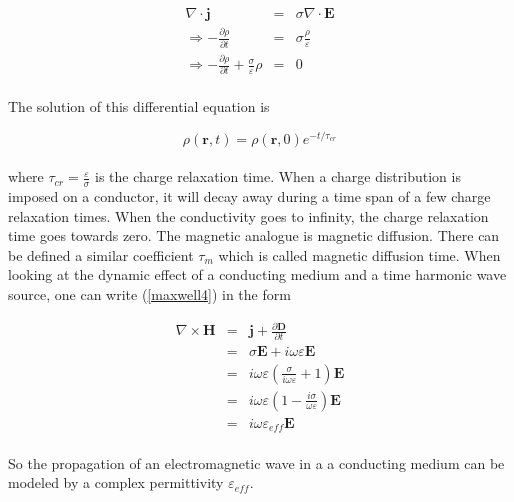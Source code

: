 \documentclass[a4paper,10pt]{thesis}
\begin{document}
\begin{eqnarray}
   \nabla \cdot \mathbf{j}&=&\sigma \nabla \cdot \mathbf{E}  \\
\Rightarrow -\frac{\partial \rho}{\partial t} &=& \sigma \frac{\rho}{\varepsilon}\\
\Rightarrow -\frac{\partial \rho}{\partial t} + \frac{\sigma}{\varepsilon}\rho &=& 0
\end{eqnarray}

\paragraph*{}
The solution of this differential equation is

\begin{equation}\label{relax_equation}
    \rho(\mathbf{r},t)=\rho(\mathbf{r},0)e^{-t/ \tau_{cr}}
\end{equation}

\paragraph*{}
where $\tau_{cr}=\frac{\varepsilon}{\sigma}$ is the charge relaxation time. When a charge distribution is imposed on a conductor, it will decay away during a time span of a few charge relaxation times. When the conductivity goes to infinity, the charge relaxation time goes towards zero. The magnetic analogue is magnetic diffusion. There can be defined a similar coefficient $\tau_{m}$ which is called magnetic diffusion time. When looking at the dynamic effect of a conducting medium and a time harmonic wave source, one can write (\ref{maxwell4}) in the form

\begin{eqnarray}
\nabla \times \mathbf{H}&=&\mathbf{j}+ \frac{\partial \mathbf{D}}{\partial t}  \nonumber \label{maxwell4_conducting medium}\\
&=&\sigma \mathbf{E}+ i \omega \varepsilon \mathbf{E} \nonumber \\
&=&i \omega\varepsilon\left( \frac{\sigma}{i \omega \varepsilon} +  1 \right)\mathbf{E} \nonumber \\
&=&i \omega \varepsilon\left( 1- \frac{ i\sigma}{ \omega \varepsilon} \right)\mathbf{E} \nonumber \\
&=&i \omega \varepsilon_{eff}\mathbf{E}
\end{eqnarray}

\paragraph*{}
So the propagation of an electromagnetic wave in a a conducting medium can be modeled by a complex permittivity $\varepsilon_{eff}$.
\end{document}

